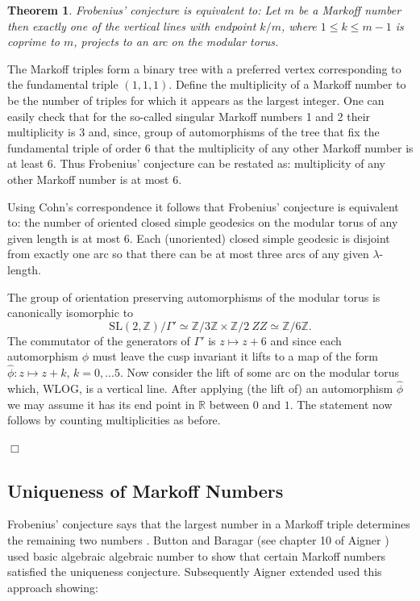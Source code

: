 \documentclass[14pt,a4paper]{amsart}
\newtheorem{thm}{Theorem}[section]
\def\ZZ{\mathbb{Z}}
\def\RR{\mathbb{R}}
\def\sl2{\mathrm{SL}(2, \ZZ)}
\begin{document}
  \begin{thm}
 Frobenius' conjecture is equivalent to:
 Let $m$ be a Markoff number then exactly one of the vertical lines
 with endpoint  $k/m$, where $1\leq k \leq m-1$ is coprime to $m$,
 projects to an arc on the modular torus.
 \end{thm}

 \proof The Markoff triples form a binary tree with a preferred vertex corresponding to
 the fundamental triple $(1,1,1)$. 
 Define the multiplicity of a Markoff number to be the  number of triples for which
 it appears as the largest integer.
 One can easily check that for the so-called singular Markoff numbers 1 and 2
 their multiplicity is 3
 and, since,
 group of automorphisms of the tree that fix the fundamental triple of order 6
 that the multiplicity of any other Markoff number is at least $6$.
 Thus Frobenius' conjecture can be restated as:
 multiplicity of any other Markoff number is at most $6$.

 Using Cohn's correspondence it follows that Frobenius' conjecture
 is equivalent to: 
 the number of oriented closed simple geodesics on the modular torus
 of any given length is at most 6.
 Each (unoriented) closed simple geodesic is disjoint from exactly one arc
 so that there can be at most three arcs of any given $\lambda$-length.

 The group of orientation preserving  automorphisms of the modular torus 
 is canonically isomorphic to 
 $$\sl2 / \Gamma' \simeq \ZZ/3\ZZ \times \ZZ/2\ ZZ \simeq \ZZ/6\ZZ .$$
 The commutator of the generators of $ \Gamma'$  is $z \mapsto z + 6$
 and since each automorphism $\phi$ must leave the cusp invariant it lifts to
 a map of the form $\hat{\phi} : z \mapsto z + k,\, k= 0,\dots 5$.
 Now consider the lift of some arc on the modular torus 
 which, WLOG, is a vertical line. 
 After applying (the lift of)  an automorphism $\hat{\phi}$ 
 we may assume it has its end point in $\RR$ between $0$ and $1$.
 The statement now follows by counting multiplicities as before.

 \hfill $\Box$
 
  \subsection{Uniqueness of Markoff Numbers}
 
  Frobenius' conjecture says that the largest number in a Markoff triple determines
  the remaining two numbers \cite{aigner}. Button and Baragar (see chapter 10 of Aigner \cite{aigner})
  used  basic algebraic algebraic number to show that certain Markoff numbers satisfied
  the uniqueness conjecture. Subsequently Aigner extended used this approach showing:
 
\end{document}
